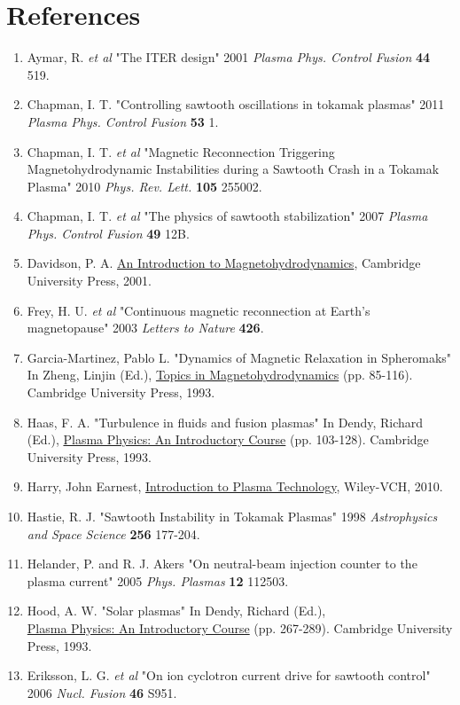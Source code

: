 \documentclass{article}
\begin{document}
\section{References}
\begin{enumerate}
\item Aymar, R. \textit{et al} "The ITER design" 2001 \textit{Plasma Phys. Control Fusion} \textbf{44} 519.
\item Chapman, I. T. "Controlling sawtooth oscillations in tokamak plasmas" 2011 \textit{Plasma Phys. Control Fusion} \textbf{53} 1.
\item Chapman, I. T. \textit{et al} "Magnetic Reconnection Triggering Magnetohydrodynamic Instabilities during a Sawtooth Crash in a Tokamak Plasma" 2010 \textit{Phys. Rev. Lett.} \textbf{105} 255002.
\item Chapman, I. T. \textit{et al} "The physics of sawtooth stabilization" 2007 \textit{Plasma Phys. Control Fusion} \textbf{49} 12B.
\item Davidson, P. A. \underline{An Introduction to Magnetohydrodynamics}, Cambridge University Press, 2001.
\item Frey, H. U. \textit{et al} "Continuous magnetic reconnection at Earth's magnetopause" 2003 \textit{Letters to Nature} \textbf{426}.
\item Garcia-Martinez, Pablo L. "Dynamics of Magnetic Relaxation in Spheromaks" In Zheng, Linjin (Ed.), \underline{Topics in Magnetohydrodynamics} (pp. 85-116). Cambridge University Press, 1993.
\item Haas, F. A. "Turbulence in fluids and fusion plasmas" In Dendy, Richard (Ed.), \underline{Plasma Physics: An Introductory Course} (pp. 103-128). Cambridge University Press, 1993.
\item Harry, John Earnest,  \underline{Introduction to Plasma Technology}, Wiley-VCH, 2010.
\item Hastie, R. J. "Sawtooth Instability in Tokamak Plasmas" 1998 \textit{Astrophysics and Space Science} \textbf{256} 177-204.
\item Helander, P. and R. J. Akers "On neutral-beam injection counter to the plasma current" 2005 \textit{Phys. Plasmas} \textbf{12} 112503.
\item Hood, A. W. "Solar plasmas" In Dendy, Richard (Ed.),\\ \underline{Plasma Physics: An Introductory Course} (pp. 267-289). Cambridge University Press, 1993.
\item Eriksson, L. G. \textit{et al} "On ion cyclotron current drive for sawtooth control" 2006 \textit{Nucl. Fusion} \textbf{46} S951.

\end{enumerate}
\end{document}
